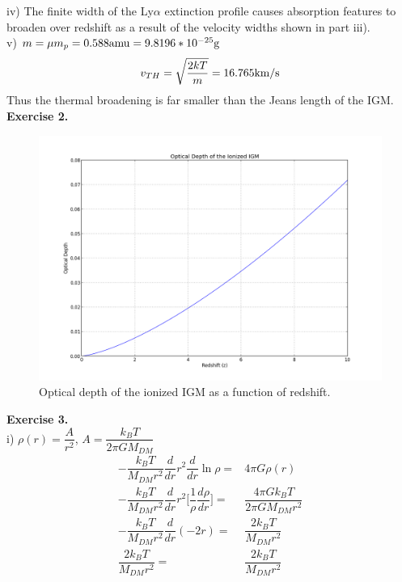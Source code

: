 \documentclass[a4paper]{article}
\begin{document}
iv) The finite width of the Ly$\alpha$ extinction profile causes absorption features to broaden over redshift as a result of the velocity widths shown in part iii).\\
v) $m = \mu m_p = 0.588{\rm amu} = 9.8196*10^{-25}{\rm g}$
\begin{align*}
v_{TH} = \sqrt{\dfrac{2kT}{m}} = 16.765 {\rm km/s}
\end{align*}
Thus the thermal broadening is far smaller than the Jeans length of the IGM.\\
\clearpage
\noindent \textbf{Exercise 2.}
\begin{figure}[h]
\centering
\includegraphics[scale=0.5]{exercise2cosmo3}
\caption{Optical depth of the ionized IGM as a function of redshift.}
\end{figure}

\noindent \textbf{Exercise 3.}\\
i) $\rho(r) = \dfrac{A}{r^2}$, $A = \dfrac{k_B T}{2 \pi G M_{DM}}$\\
\begin{align*}
-\dfrac{k_BT}{M_{DM}r^2}\dfrac{d}{dr}r^2\dfrac{d}{dr}\ln \rho =& 4 \pi G \rho(r)\\
-\dfrac{k_BT}{M_{DM}r^2}\dfrac{d}{dr}r^2 \big[\dfrac{1}{\rho}\dfrac{d\rho}{dr}\big] =& \dfrac{4 \pi G k_B T}{2 \pi G M_{DM}r^2}\\
-\dfrac{k_BT}{M_{DM}r^2}\dfrac{d}{dr}(-2r) =& \dfrac{2k_BT}{M_{DM}r^2}\\
\dfrac{2k_BT}{M_{DM}r^2} =& \dfrac{2k_BT}{M_{DM}r^2}
\end{align*}
\end{document}
